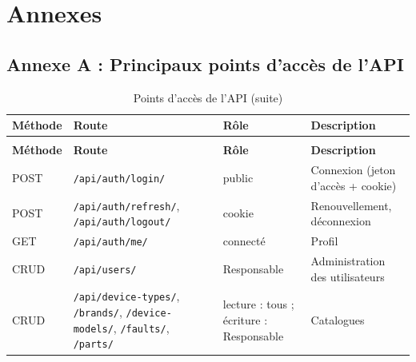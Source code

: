 \chapter*{Annexes}
\setcounter{table}{0}\setcounter{figure}{0}
\renewcommand{\thetable}{A.\arabic{table}}\renewcommand{\thefigure}{A.\arabic{figure}}
\setlength{\emergencystretch}{2em}

\section*{Annexe A : Principaux points d'accès de l'API}

{\footnotesize{}\renewcommand{\arraystretch}{1.3}
\begin{longtable}{|>{\raggedright\arraybackslash}p{1.91cm}|>{\raggedright\arraybackslash}p{5.72cm}|>{\raggedright\arraybackslash}p{2.77cm}|>{\raggedright\arraybackslash}p{3.47cm}|}
\caption{Points d'accès de l'API}\\
\hline
\rowcolor{ALbleu} \sffamily\bfseries\color{white} Méthode & \sffamily\bfseries\color{white} Route & \sffamily\bfseries\color{white} Rôle & \sffamily\bfseries\color{white} Description \\ \hline
\endfirsthead
\caption[]{Points d'accès de l'API (suite)}\\
\hline
\rowcolor{ALbleu} \sffamily\bfseries\color{white} Méthode & \sffamily\bfseries\color{white} Route & \sffamily\bfseries\color{white} Rôle & \sffamily\bfseries\color{white} Description \\ \hline
\endhead
POST & \texttt{/\allowbreak{}api/\allowbreak{}auth/\allowbreak{}login/\allowbreak{}} & public & Connexion (jeton d'accès + cookie) \\ \hline
\rowcolor{ALgris} POST & \texttt{/\allowbreak{}api/\allowbreak{}auth/\allowbreak{}refresh/\allowbreak{}}, \texttt{/\allowbreak{}api/\allowbreak{}auth/\allowbreak{}logout/\allowbreak{}} & cookie & Renouvellement, déconnexion \\ \hline
GET & \texttt{/\allowbreak{}api/\allowbreak{}auth/\allowbreak{}me/\allowbreak{}} & connecté & Profil \\ \hline
\rowcolor{ALgris} CRUD & \texttt{/\allowbreak{}api/\allowbreak{}users/\allowbreak{}} & Responsable & Administration des utilisateurs \\ \hline
CRUD & \texttt{/\allowbreak{}api/\allowbreak{}device-\allowbreak{}types/\allowbreak{}}, \texttt{/\allowbreak{}brands/\allowbreak{}}, \texttt{/\allowbreak{}device-\allowbreak{}models/\allowbreak{}}, \texttt{/\allowbreak{}faults/\allowbreak{}}, \texttt{/\allowbreak{}parts/\allowbreak{}} & lecture : tous ; écriture : Responsable & Catalogues \\ \hline

\end{longtable}}
